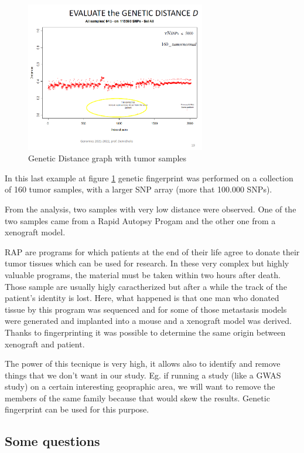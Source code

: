 \begin{figure}
	\centering
	\includegraphics[width=0.7\textwidth]{Images/Distance3.PNG}
	\caption{\label{fig:Distance3}Genetic Distance graph with tumor samples}
\end{figure}

\bigskip
In this last example at figure \ref{fig:Distance3} genetic fingerprint was performed on a collection of 160  tumor samples, with a larger SNP array (more that 100.000 SNPs).  

From the analysis, two samples with very low distance were observed. One of the two samples came from a 
Rapid Autopsy Progam and the other one from a xenograft model. 

RAP are programs for which patients at the end of their life agree to donate their tumor tissues which can be used for research. In these very complex but highly valuable programs, the material must be taken within two hours after death. Those sample are usually higly caractherized but after a while the track of the patient's identity is lost. 
Here, what happened is that one man who donated tissue by this program was sequenced and for some of those metastasis models were generated and implanted into a mouse and a xenograft model was derived. Thanks to fingerprinting it was possible to determine the same origin between xenograft and patient. 

The power of this tecnique is very high, it allows also to identify and remove things that we don't want in our study. Eg. if running a study (like a GWAS study) on a certain interesting geopraphic area, we will want to remove the members of the same family because that would skew the results. Genetic fingerprint can be used for this purpose.

\subsection*{Some questions}

